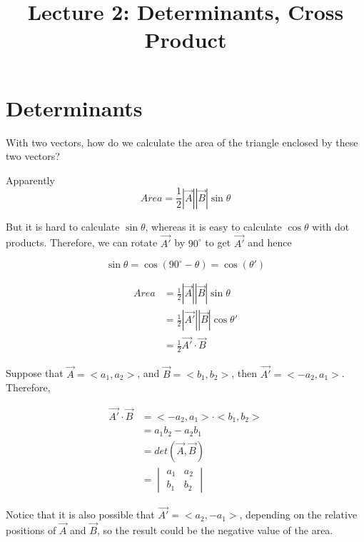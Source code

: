 \documentclass{article}
\title{Lecture 2: Determinants, Cross Product}
\author{}
\date{}
\begin{document}
    
\maketitle

\section{Determinants}

With two vectors, how do we calculate the area of the triangle enclosed by
these two vectors?


Apparently
\[
  Area = \frac{1}{2}|\vec{A}||\vec{B}|\sin\theta
\]

But it is hard to calculate $\sin\theta$, whereas it is easy to calculate
$\cos\theta$ with dot products. Therefore, we can rotate $\vec{A'}$ by
$90^{\circ}$ to get $\vec{A'}$ and hence

\[
  \sin\theta = \cos(90^{\circ} - \theta) = \cos(\theta')
\]

\[
  \begin{split}
  Area  &= \frac{1}{2} |\vec{A}| |\vec{B}| \sin\theta \\
        &= \frac{1}{2} |\vec{A'}| |\vec{B}| \cos\theta' \\
        &= \frac{1}{2} \vec{A'} \cdot \vec{B}
  \end{split}
\]

Suppose that $\vec{A} = <a_1, a_2>$, and $\vec{B} = <b_1, b_2>$, then
$\vec{A'} = <-a_2, a_1>$. Therefore,

\[
  \begin{split}
  \vec{A'} \cdot \vec{B}  &= <-a_2, a_1> \cdot <b_1, b_2> \\
                          &= a_1 b_2 - a_2 b_1 \\
                          &= det(\vec{A}, \vec{B}) \\
                          &=  \begin{vmatrix}
                                a_1 & a_2 \\
                                b_1 & b_2
                              \end{vmatrix}
  \end{split}
\]

Notice that it is also possible that $\vec{A'} = <a_2, -a_1>$, depending on 
the relative positions of $\vec{A}$ and $\vec{B}$, so the result could be the
negative value of the area.
\end{document}
